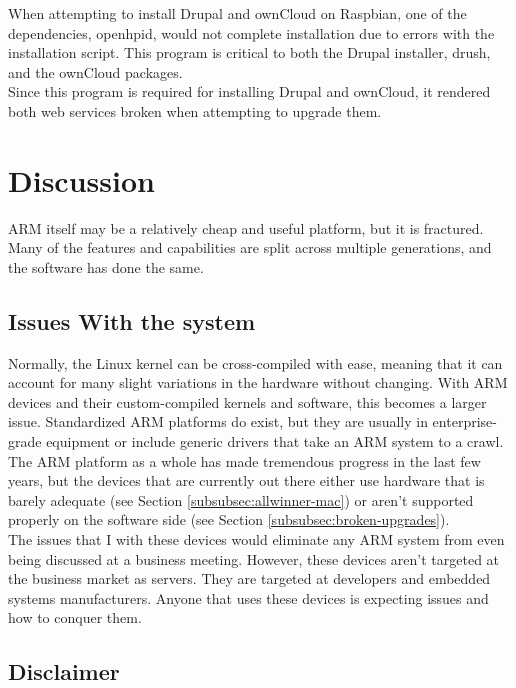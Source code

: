 \documentclass[12pt]{spieman}  %
\begin{document}
When attempting to install Drupal and ownCloud on Raspbian, one of the dependencies, openhpid, would not complete installation due to errors with the installation script. This program is critical to both the Drupal installer, drush, and the ownCloud packages. \\

Since this program is required for installing Drupal and ownCloud, it rendered both web services broken when attempting to upgrade them.

\section{Discussion}
\label{sec:discussion}

ARM itself may be a relatively cheap and useful platform, but it is fractured. Many of the features and capabilities are split across multiple generations, and the software has done the same.

\subsection{Issues With the system}
\label{subsec:more-issues}

Normally, the Linux kernel can be cross-compiled with ease, meaning that it can account for many slight variations in the hardware without changing. With ARM devices and their custom-compiled kernels and software, this becomes a larger issue. Standardized ARM platforms do exist, but they are usually in enterprise-grade equipment or include generic drivers that take an ARM system to a crawl.\\

The ARM platform as a whole has made tremendous progress in the last few years, but the devices that are currently out there either use hardware that is barely adequate (see Section \ref{subsubsec:allwinner-mac}) or aren't supported properly on the software side (see Section \ref{subsubsec:broken-upgrades}).\\

The issues that I with these devices would eliminate any ARM system from even being discussed at a business meeting. However, these devices aren't targeted at the business market as servers. They are targeted at developers and embedded systems manufacturers. Anyone that uses these devices is expecting issues and how to conquer them.

\subsection{Disclaimer}
\label{subsec:disclaimer}
\end{document}
